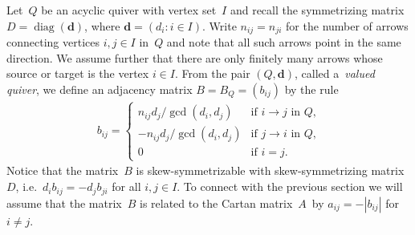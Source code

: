 Let~$Q$ be an acyclic quiver with vertex set~$I$ and recall the symmetrizing matrix $D=\operatorname{diag}(\mathbf{d})$,
where $\mathbf{d}=(d_i: i\in I)$.
Write $n_{ij}=n_{ji}$ for the number of arrows connecting vertices $i,j\in I$ in~$Q$ and note that all such arrows point in the same direction.
We assume further that there are only f\/initely many arrows whose source or target is the vertex $i\in I$.
From the pair $(Q,\mathbf{d})$, called a~\emph{valued quiver}, we def\/ine an adjacency matrix $B=B_Q=(b_{ij})$ by the rule
\begin{gather*}
b_{ij}=
\begin{cases}
n_{ij}d_j/\gcd(d_i,d_j) & \text{if $i\to j$ in~$Q$,}
\\
-n_{ij}d_j/\gcd(d_i,d_j) & \text{if $j\to i$ in~$Q$,}
\\
0 & \text{if $i=j$.}
\end{cases}
\end{gather*}
Notice that the matrix~$B$ is skew-symmetrizable with skew-symmetrizing matrix~$D$, i.e.~$d_ib_{ij}=-d_jb_{ji}$ for all $i,j\in I$.
To connect with the previous section we will assume that the matrix~$B$ is related to the Cartan matrix~$A$~by
$a_{ij}=-|b_{ij}|$ for $i\ne j$.

